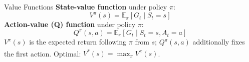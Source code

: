 \begin{v3topic}{Value Functions}
        \textbf{State-value function} under policy $\pi$:
        \begin{equation}
            V^{\pi}(s) = \mathbb{E}_{\pi}\!\left[G_t \mid S_t = s\right]
        \end{equation}
        \textbf{Action-value (Q) function} under policy $\pi$:
        \begin{equation}
            Q^{\pi}(s, a) = \mathbb{E}_{\pi}\!\left[G_t \mid S_t = s, A_t = a\right]
        \end{equation}
        $V^{\pi}(s)$ is the expected return following $\pi$ from $s$;
        $Q^{\pi}(s,a)$ additionally fixes the first action.
        Optimal: $V^*(s) = \max_\pi V^\pi(s)$.\textsuperscript{\cite[][p.~143]{barberBayesianReasoningMachine2012}}

\end{v3topic}
